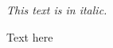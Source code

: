 \cleardoublepage


\begin{acknowledgements}
\textit{This text is in italic.}

Text here

\end{acknowledgements}